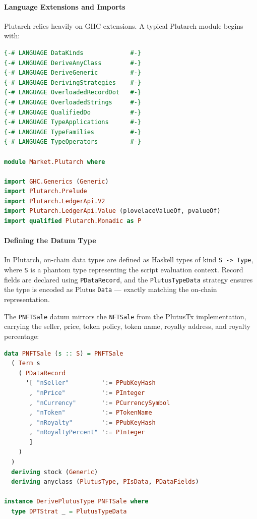 \paragraph{Language Extensions and Imports}

Plutarch relies heavily on GHC extensions. A typical Plutarch module begins with:

\begin{lstlisting}[language=haskell, caption=Plutarch Language Extensions]
{-# LANGUAGE DataKinds             #-}
{-# LANGUAGE DeriveAnyClass        #-}
{-# LANGUAGE DeriveGeneric         #-}
{-# LANGUAGE DerivingStrategies    #-}
{-# LANGUAGE OverloadedRecordDot   #-}
{-# LANGUAGE OverloadedStrings     #-}
{-# LANGUAGE QualifiedDo           #-}
{-# LANGUAGE TypeApplications      #-}
{-# LANGUAGE TypeFamilies          #-}
{-# LANGUAGE TypeOperators         #-}

module Market.Plutarch where

import GHC.Generics (Generic)
import Plutarch.Prelude
import Plutarch.LedgerApi.V2
import Plutarch.LedgerApi.Value (plovelaceValueOf, pvalueOf)
import qualified Plutarch.Monadic as P
\end{lstlisting}

\paragraph{Defining the Datum Type}

In Plutarch, on-chain data types are defined as Haskell types of kind \texttt{S -> Type}, where \texttt{S} is a phantom type representing the script evaluation context. Record fields are declared using \texttt{PDataRecord}, and the \texttt{PlutusTypeData} strategy ensures the type is encoded as Plutus \texttt{Data} --- exactly matching the on-chain representation.

The \texttt{PNFTSale} datum mirrors the \texttt{NFTSale} from the PlutusTx implementation, carrying the seller, price, token policy, token name, royalty address, and royalty percentage:

\begin{lstlisting}[language=haskell, caption=Plutarch Datum Definition]
data PNFTSale (s :: S) = PNFTSale
  ( Term s
    ( PDataRecord
      '[ "nSeller"         ':= PPubKeyHash
       , "nPrice"          ':= PInteger
       , "nCurrency"       ':= PCurrencySymbol
       , "nToken"          ':= PTokenName
       , "nRoyalty"        ':= PPubKeyHash
       , "nRoyaltyPercent" ':= PInteger
       ]
    )
  )
  deriving stock (Generic)
  deriving anyclass (PlutusType, PIsData, PDataFields)

instance DerivePlutusType PNFTSale where
  type DPTStrat _ = PlutusTypeData
\end{lstlisting}

